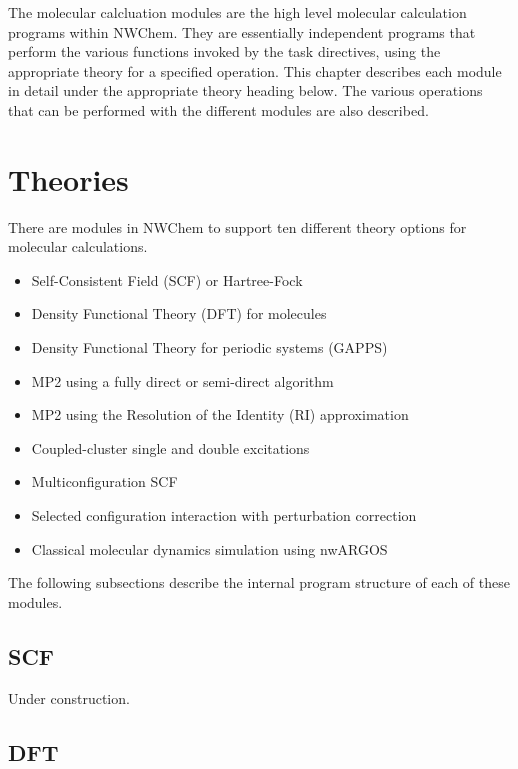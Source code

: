 
\label{sec:modules}

The molecular calcluation modules are the high level molecular
calculation programs within NWChem.  They are essentially independent
programs that perform the various functions invoked by the
task directives, using the appropriate theory for a specified
operation.  This chapter describes each module in detail under
the appropriate theory heading below.  The various operations
that can be performed with the different modules are also described.

\section{Theories}

There are modules in NWChem to support ten different theory options
for molecular calculations.  
\begin{itemize}
 \item Self-Consistent Field (SCF) or Hartree-Fock
 \item Density Functional Theory (DFT) for molecules
 \item Density Functional Theory for periodic systems (GAPPS)
 \item MP2 using a fully direct or semi-direct algorithm
 \item MP2 using the Resolution of the Identity (RI) approximation
 \item Coupled-cluster single and double excitations
 \item Multiconfiguration SCF
 \item Selected configuration interaction with perturbation
   correction 
 \item Classical molecular dynamics simulation using nwARGOS
\end{itemize}


The following subsections describe the internal program structure of each
of these modules.

\subsection{SCF}

Under construction.

\subsection{DFT}

